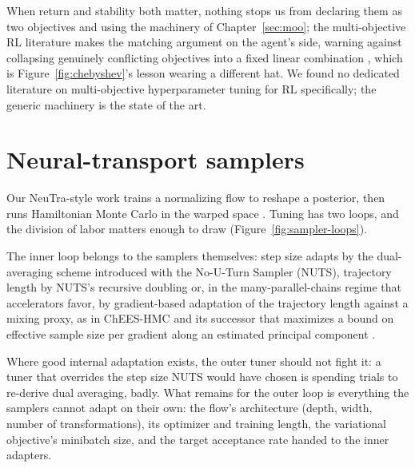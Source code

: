 When return and stability both matter, nothing stops us from declaring
them as two objectives and using the machinery of Chapter~\ref{sec:moo};
the multi-objective RL literature makes the matching argument on the
agent's side, warning against collapsing genuinely conflicting
objectives into a fixed linear combination \citep{hayes2022morl}, which
is Figure~\ref{fig:chebyshev}'s lesson wearing a different hat. We found
no dedicated literature on multi-objective hyperparameter tuning for RL
specifically; the generic machinery is the state of the art.

\section{Neural-transport samplers}

Our NeuTra-style work trains a normalizing flow to reshape a posterior,
then runs Hamiltonian Monte Carlo in the warped space
\citep{hoffman2019neutra}. Tuning has two loops, and the division of
labor matters enough to draw (Figure~\ref{fig:sampler-loops}).

The inner
loop belongs to the samplers themselves: step size adapts by the
dual-averaging scheme introduced with the No-U-Turn Sampler (NUTS),
trajectory length by NUTS's
recursive doubling \citep{hoffman2014nuts} or, in the
many-parallel-chains regime that accelerators favor, by gradient-based
adaptation of the trajectory length against a mixing proxy, as in
ChEES-HMC \citep{hoffman2021chees} and its successor that maximizes a
bound on effective sample size per gradient along an estimated principal
component \citep{sountsov2021snaper}.

Where good internal adaptation
exists, the outer tuner should not fight it: a tuner that overrides the
step size NUTS would have chosen is spending trials to re-derive
dual averaging, badly. What remains for the outer loop is everything the
samplers cannot adapt on their own: the flow's architecture (depth,
width, number of transformations), its optimizer and training length,
the variational objective's minibatch size, and the target acceptance
rate handed to the inner adapters.

